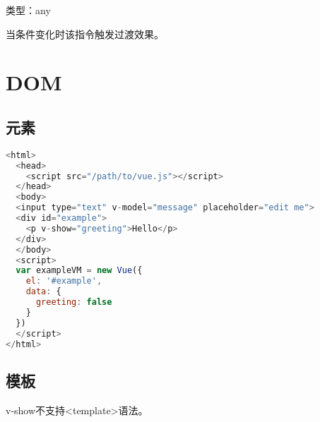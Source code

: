 \begin{compactitem}
\item 类型：any
\end{compactitem}

当条件变化时该指令触发过渡效果。

\section{DOM}

\subsection{元素}


\begin{lstlisting}[language=JavaScript]
<html>
  <head>
    <script src="/path/to/vue.js"></script>
  </head>
  <body>
  <input type="text" v-model="message" placeholder="edit me">
  <div id="example">
    <p v-show="greeting">Hello</p>
  </div>
  </body>
  <script>
  var exampleVM = new Vue({
    el: '#example',
    data: {
      greeting: false
    }
  })
  </script>
</html>
\end{lstlisting}

\subsection{模板}

v-show不支持<template>语法。


\begin{lstlisting}[language=JavaScript]

\end{lstlisting}



\begin{lstlisting}[language=JavaScript]

\end{lstlisting}




\begin{lstlisting}[language=JavaScript]

\end{lstlisting}




\begin{lstlisting}[language=JavaScript]

\end{lstlisting}




\begin{lstlisting}[language=JavaScript]

\end{lstlisting}




